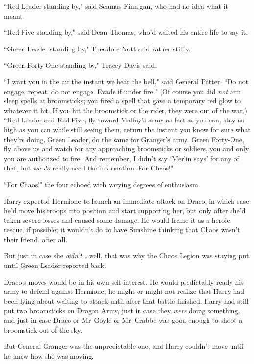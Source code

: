``Red Leader standing by," said Seamus Finnigan, who had no idea what it meant.

``Red Five standing by," said Dean Thomas, who'd waited his entire life to say it.

``Green Leader standing by," Theodore Nott said rather stiffly.

``Green Forty-One standing by," Tracey Davis said.

``I want you in the air the instant we hear the bell," said General Potter. ``Do not engage, repeat, do not engage. Evade if under fire." (Of course you did \emph{not} aim sleep spells at broomsticks; you fired a spell that gave a temporary red glow to whatever it hit. If you hit the broomstick or the rider, they were out of the war.) ``Red Leader and Red Five, fly toward Malfoy's army as fast as you can, stay as high as you can while still seeing them, return the instant you know for sure what they're doing. Green Leader, do the same for Granger's army. Green Forty-One, fly above us and watch for any approaching broomsticks or soldiers, you and only you are authorized to fire. And remember, I didn't say `Merlin says' for any of that, but we \emph{do} really need the information. For Chaos!"

``For Chaos!" the four echoed with varying degrees of enthusiasm.

Harry expected Hermione to launch an immediate attack on Draco, in which case he'd move his troops into position and start supporting her, but only after she'd taken severe losses and caused some damage. He would frame it as a heroic rescue, if possible; it wouldn't do to have Sunshine thinking that Chaos wasn't their friend, after all.

But just in case she \emph{didn't} {\ldots}well, that was why the Chaos Legion was staying put until Green Leader reported back.

Draco's moves would be in his own self-interest. He would predictably ready his army to defend against Hermione; he might or might not realize that Harry had been lying about waiting to attack until after that battle finished. Harry had still put two broomsticks on Dragon Army, just in case they \emph{were} doing something, and just in case Draco or Mr~Goyle or Mr~Crabbe was good enough to shoot a broomstick out of the sky.

But General Granger was the unpredictable one, and Harry couldn't move until he knew how she was moving.

\later

